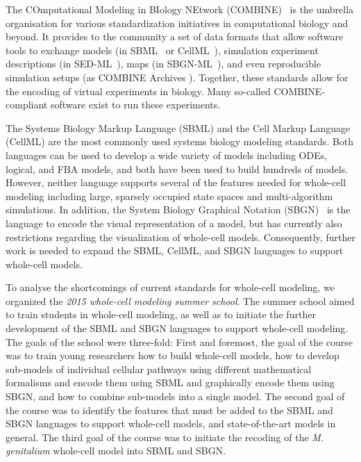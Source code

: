\documentclass[journal,transmag]{IEEEtran}
\begin{document}
The COmputational Modeling in BIology NEtwork (COMBINE)~\cite{le2011meeting} is the umbrella organisation for various standardization initiatives in computational biology and beyond.
It provides  to the community a set of data formats that allow software tools to exchange models (in SBML~\cite{hucka2003} or CellML~\cite{hedley_2001b}), simulation experiment descriptions (in SED-ML~\cite{sedml2011}), maps (in SBGN-ML~\cite{IerselVCBBLDSDMFAMMKNS12}), and even reproducible simulation setups (as COMBINE Archives \cite{Bergmann2014combine}).  
Together, these standards allow for the encoding of virtual experiments in biology. 
Many so-called COMBINE-compliant software exist to run these experiments. 

The Systems Biology Markup Language (SBML) and the Cell Markup Language (CellML) are the most commonly used systems biology modeling standards. 
Both languages can be used to develop a wide variety of models including ODEs, logical, and FBA models, and both have been used to build hundreds of models. 
However, neither language supports several of the features needed for whole-cell modeling including large, sparsely occupied state spaces and multi-algorithm simulations. 
In addition, the System Biology Graphical Notation (SBGN)~\cite{LeNovereHMMSS09} is the language to encode the visual representation of a model, but has currently also restrictions regarding the visualization of whole-cell models. 
Consequently, further work is needed to expand the SBML, CellML, and SBGN languages to support whole-cell models.

To analyse the shortcomings of current standards for whole-cell modeling, we organized the \emph{2015 whole-cell modeling summer school}. 
The summer school aimed to train students in whole-cell modeling, as well as to initiate the further development of the SBML and SBGN languages to support whole-cell modeling.  
The goals of the school were three-fold: 
First and foremost, the goal of the course was to train young researchers how to build whole-cell models, how to develop sub-models of individual cellular pathways using different mathematical formalisms and encode them using SBML and graphically encode them using SBGN, and how to combine sub-models into a single model. 
The second goal of the course was to identify the features that must be added to the SBML and SBGN languages to support whole-cell models, and state-of-the-art models in general. 
The third goal of the course was to initiate the recoding of the \textit{M. genitalium} whole-cell model into SBML and SBGN.
\end{document}
